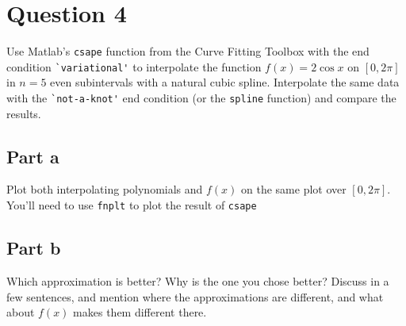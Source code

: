 \section{Question 4}

\begin{question}
    Use Matlab's \verb+csape+ function from the Curve Fitting Toolbox with the end condition \verb+`variational'+ to interpolate the function $f(x) = 2\cos x$ on $[0,2\pi]$ in $n=5$ even subintervals with a natural cubic spline. Interpolate the same data with the \verb+`not-a-knot'+ end condition (or the \verb+spline+ function) and compare the results.
\end{question}

\subsection{Part a}

\begin{question}
    Plot both interpolating polynomials and $f(x)$ on the same plot over $[0,2\pi]$. You'll need to use \verb+fnplt+ to plot the result of \verb+csape+
\end{question}

\begin{answer}
    
\end{answer}

\subsection{Part b}

\begin{question}
    Which approximation is better? Why is the one you chose better? Discuss in a few sentences, and mention where the approximations are different, and what about $f(x)$ makes them different there.
\end{question}

\begin{answer}
    
\end{answer}